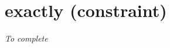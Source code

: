 \section{exactly (constraint)}\label{exactly:exactlyconstraint}\hypertarget{exactly:exactlyconstraint}{}
\emph{To complete}
